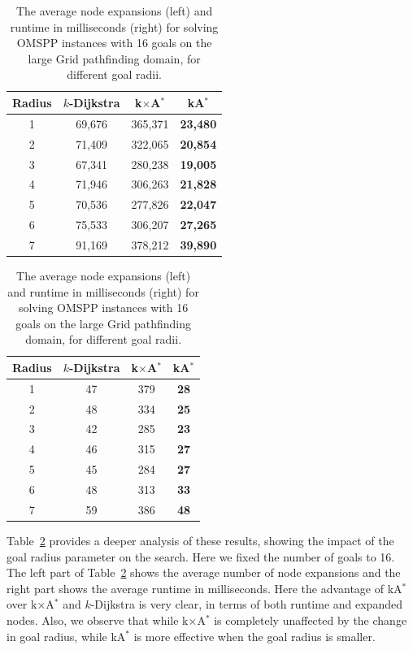 \documentclass[smallextended]{svjour3}       %
\newcommand{\kD}{$k$-Dijkstra\xspace}
\newcommand{\omspp}{\ac{OMSPP}\xspace}
\newcommand{\kastar}{kA$^*$\xspace}
\newcommand{\kxastar}{k$\times$A$^*$\xspace}
\begin{document}
\begin{table}
  \centering
    \begin{tabular}{cccc}
      \toprule
      Radius  & \kD & \kxastar & \kastar \\
      \midrule
    1      & 69,676             & 365,371                 & \textbf{23,480} \\
    2      & 71,409             & 322,065                 & \textbf{20,854} \\
    3      & 67,341             & 280,238                 & \textbf{19,005} \\
    4      & 71,946             & 306,263                 & \textbf{21,828} \\
    5      & 70,536             & 277,826                 & \textbf{22,047} \\
    6      & 75,533             & 306,207                 & \textbf{27,265} \\
    7      & 91,169             & 378,212                 & \textbf{39,890} \\
      \bottomrule
    \end{tabular}
    \qquad
    \begin{tabular}{cccc}
	  \toprule
	  Radius  & \kD & \kxastar & \kastar \\
	  \midrule
        1      & 47                 & 379                     & \textbf{28} \\
        2      & 48                 & 334                     & \textbf{25} \\
        3      & 42                 & 285                     & \textbf{23} \\
        4      & 46                 & 315                     & \textbf{27} \\
        5      & 45                 & 284                     & \textbf{27} \\
        6      & 48                 & 313                     & \textbf{33} \\
        7      & 59                 & 386                     & \textbf{48} \\
	  \bottomrule
	\end{tabular}
  \caption{The average node expansions (left) and runtime in milliseconds (right) for solving \omspp instances with 16 goals on the large Grid pathfinding domain, for different goal radii.}
  \label{tab:pathfinding-radius}
\end{table}



Table~\ref{tab:pathfinding-radius} provides a deeper analysis of these results, showing the impact of the goal radius parameter on the search. Here we fixed the number of goals to 16. The left part of Table~\ref{tab:pathfinding-radius} shows the average number of node expansions and the right part shows the average runtime in milliseconds. Here the advantage of \kastar over \kxastar and \kD is very clear, in terms of both runtime and expanded nodes. Also, 
we observe that while \kxastar is completely unaffected by the change in goal radius, 
while \kastar is more effective when the goal radius is smaller. 
\end{document}
